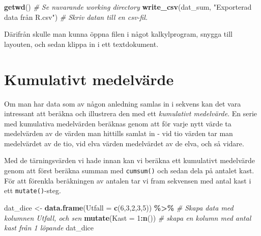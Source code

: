 \documentclass[
]{book}
\newenvironment{Shaded}{\begin{snugshade}}{\end{snugshade}}
\newcommand{\AttributeTok}[1]{\textcolor[rgb]{0.13,0.29,0.53}{#1}}
\newcommand{\CommentTok}[1]{\textcolor[rgb]{0.56,0.35,0.01}{\textit{#1}}}
\newcommand{\DecValTok}[1]{\textcolor[rgb]{0.00,0.00,0.81}{#1}}
\newcommand{\FunctionTok}[1]{\textcolor[rgb]{0.13,0.29,0.53}{\textbf{#1}}}
\newcommand{\NormalTok}[1]{#1}
\newcommand{\OtherTok}[1]{\textcolor[rgb]{0.56,0.35,0.01}{#1}}
\newcommand{\SpecialCharTok}[1]{\textcolor[rgb]{0.81,0.36,0.00}{\textbf{#1}}}
\newcommand{\StringTok}[1]{\textcolor[rgb]{0.31,0.60,0.02}{#1}}
\theoremstyle{definition}
\theoremstyle{definition}
\theoremstyle{definition}
\theoremstyle{definition}
\theoremstyle{remark}
\begin{document}
\begin{Shaded}
\begin{Highlighting}[]
\FunctionTok{getwd}\NormalTok{()                                                    }\CommentTok{\# Se nuvarande working directory}
\FunctionTok{write\_csv}\NormalTok{(dat\_sum, }\StringTok{"Exporterad data från R.csv"}\NormalTok{)           }\CommentTok{\# Skriv datan till en csv{-}fil.}
\end{Highlighting}
\end{Shaded}

Därifrån skulle man kunna öppna filen i något kalkylprogram, snygga till layouten, och sedan klippa in i ett textdokument.

\hypertarget{kumulativt-medelvuxe4rde}{%
\section{Kumulativt medelvärde}\label{kumulativt-medelvuxe4rde}}

Om man har data som av någon anledning samlas in i sekvens kan det vara intressant att beräkna och illustrera den med ett \emph{kumulativt medelvärde}. En serie med kumulativa medelvärden beräknas genom att för varje nytt värde ta medelvärden av de värden man hittills samlat in - vid tio värden tar man medelvärdet av de tio, vid elva värden medelvärdet av de elva, och så vidare.

Med de tärningsvärden vi hade innan kan vi beräkna ett kumulativt medelvärde genom att först beräkna summan med \texttt{cumsum()} och sedan dela på antalet kast. För att förenkla beräkningen av antalen tar vi fram sekvensen med antal kast i ett \texttt{mutate()}-steg.

\begin{Shaded}
\begin{Highlighting}[]
\NormalTok{dat\_dice }\OtherTok{\textless{}{-}} \FunctionTok{data.frame}\NormalTok{(}\AttributeTok{Utfall =} \FunctionTok{c}\NormalTok{(}\DecValTok{6}\NormalTok{,}\DecValTok{3}\NormalTok{,}\DecValTok{2}\NormalTok{,}\DecValTok{3}\NormalTok{,}\DecValTok{5}\NormalTok{)) }\SpecialCharTok{\%\textgreater{}\%}               \CommentTok{\# Skapa data med kolumnen Utfall, och sen}
  \FunctionTok{mutate}\NormalTok{(}\AttributeTok{Kast =} \DecValTok{1}\SpecialCharTok{:}\FunctionTok{n}\NormalTok{())                                          }\CommentTok{\# skapa en kolumn med antal kast från 1 löpande}
\NormalTok{dat\_dice}
\end{Highlighting}
\end{Shaded}
\end{document}
